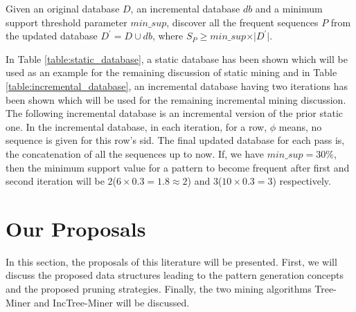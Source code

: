 \begin{definition} \label{definition:ispm}
    Given an original database $D$, an incremental database $db$ and a minimum support threshold parameter $min\_sup$, discover all the frequent sequences $P$ from the updated database $D^{\prime}=D \cup db$, where $S_{P} \geq min\_sup \times \vert D^{\prime} \vert.$
\end{definition}
In Table \ref{table:static_database}, a static database has been shown which will be used as an example for the remaining discussion of static mining and in Table \ref{table:incremental_database}, an incremental database having two iterations has been shown which will be used for the remaining incremental mining discussion. The following incremental database is an incremental version of the prior static one. In the incremental database, in each iteration, for a row, $\phi$ means, no sequence is given for this row's sid. The final updated database for each pass is, the concatenation of all the sequences up to now. If, we have $min\_sup=30\%$, then the minimum support value for a pattern to become frequent after first and second iteration will be 2($6 \times 0.3=1.8 \approx 2$) and 3($10 \times 0.3=3$) respectively.




\section{Our Proposals} \label{proposals}
In this section, the proposals of this literature will be presented. First, we will discuss the proposed data structures leading to the pattern generation concepts and the proposed pruning strategies. Finally, the two mining algorithms Tree-Miner and IncTree-Miner will be discussed.


